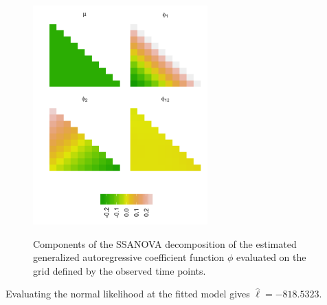 %
\begin{figure}[H] 
\centering
\caption{Components of the SSANOVA decomposition of the estimated generalized autoregressive coefficient function $\phi$ evaluated on the grid defined by the observed time points.}
  \includegraphics[width = 0.6\textwidth]{img/chapter-5/cattle-ssanova-estimate-lattice} \label{fig:cattle-fitted-cholesky-ssanova}
\end{figure}

{}

Evaluating the normal likelihood at the fitted model gives $\hat{\ell} = -818.5323$.


%
%
%
